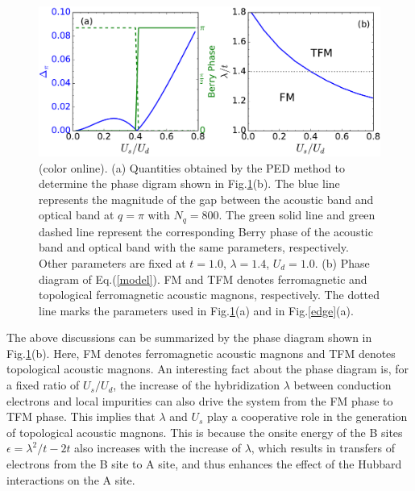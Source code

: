 \documentclass[amsmath,superscriptaddress,showpacs,aps,prb,twocolumn]{revtex4-1}
\begin{document}
\begin{figure}
\includegraphics[scale=0.35]{gap_berry_and_phase_diagram}
\caption{(color online). (a) Quantities obtained by the PED method to determine the phase digram shown in Fig.\ref{gap}(b). The blue line represents the magnitude of the gap between the acoustic band and optical band at $q=\pi$ with $N_q=800$. The green solid line and green dashed line represent the corresponding Berry phase of the acoustic band and optical band with the same parameters, respectively. Other parameters are fixed at $t=1.0$, $\lambda=1.4$, $U_d=1.0$. (b) Phase diagram of Eq.(\ref{model}). FM and TFM denotes ferromagnetic  and topological ferromagnetic acoustic magnons, respectively. The dotted line marks the parameters used in Fig.\ref{gap}(a) and in Fig.\ref{edge}(a).}
\label{gap}
\end{figure}

\par The above discussions can be summarized by the phase diagram shown in Fig.\ref{gap}(b). Here, FM denotes ferromagnetic acoustic magnons and TFM denotes topological acoustic magnons. An interesting fact about the phase diagram is, for a fixed ratio of $U_s/U_d$, the increase of the hybridization $\lambda$ between conduction electrons and local impurities can also drive the system from the FM phase to TFM phase. This implies that $\lambda$ and $U_s$ play a cooperative role in the generation of topological acoustic magnons. This is because the onsite energy of the B sites $\epsilon=\lambda^2/t-2t$ also increases with the increase of $\lambda$, which results in transfers of electrons from the B site to A site, and thus enhances the effect of the Hubbard interactions on the A site.
\end{document}
